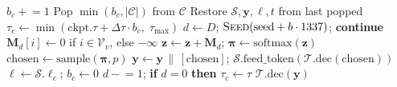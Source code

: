 \begin{algorithm}[H]
\begin{algorithmic}[1]
               $b_c \mathrel{+}= 1$
        \State Pop $\min(b_c, |\mathcal{C}|)$
               from $\mathcal{C}$
        \State Restore $\mathcal{S}, \mathbf{y},
               \ell, t$ from last popped
        \State $\tau_c \gets \min(\text{ckpt}.\tau
               + \Delta\tau \cdot b_c,\;
               \tau_{\max})$
        \State $d \gets D$;\;
               $\textsc{Seed}(\text{seed}
               + b \cdot 1337)$;\;
               \textbf{continue}
    \EndIf
    \State {}
    \State $\mathbf{M}_d[i] \gets 0$ if
           $i \in \mathcal{V}_v$, else $-\infty$
    \State $\mathbf{z} \gets \mathbf{z} + \mathbf{M}_d$;\;
           $\boldsymbol{\pi} \gets
           \text{softmax}(\mathbf{z})$
    \State $\text{chosen} \gets
           \text{sample}(\boldsymbol{\pi}, p)$
    \State {}
    \State $\mathbf{y} \gets \mathbf{y} \,\|\,
           [\text{chosen}]$;\;
           $\mathcal{S}.\text{feed\_token}(
           \mathcal{T}.\text{dec}(\text{chosen}))$
    \State $\ell \gets \mathcal{S}.\ell_c$;\;
           $b_c \gets 0$
    \State {}
        \State $d \mathrel{-}= 1$;\;
               \textbf{if} $d = 0$
               \textbf{then} $\tau_c \gets \tau$
    \EndIf
\EndFor
\State \Return $\mathcal{T}.\text{dec}(\mathbf{y})$
\end{algorithmic}
\end{algorithm}



